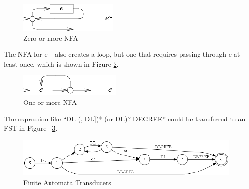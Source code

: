 \begin{figure}[htbp]
  \centering
  \includegraphics[scale=1]{images/star.png}
  \caption{Zero or more NFA}
  \label{fig:nfa_star}
\end{figure}

The NFA for e+ also creates a loop, but one that requires passing through e at least once, which is shown in Figure \ref{fig:nfa_plus}.

\begin{figure}[htbp]
  \centering
  \includegraphics[scale=1]{images/plus.png}
  \caption{One or more NFA}
  \label{fig:nfa_plus}
\end{figure}



The expression like ``DL (, DL])*  (or DL)? DEGREE'' could be transferred to an FST in Figure ~\ref{fig:fst}.

\begin{figure}[htbp]
  \centering
  \includegraphics[scale=0.6]{images/test_tokenre2_6.png}
  \caption{Finite Automata Transducers}
  \label{fig:fst}
\end{figure}



